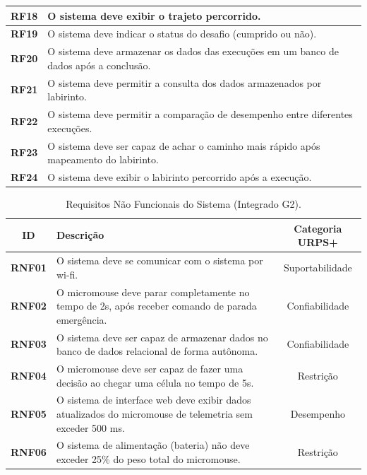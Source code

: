 \begin{table}[htbp]
\begin{center}
\begin{tabular}{|c|p{13cm}|}
\textbf{RF18} & O sistema deve exibir o trajeto percorrido. \\ \hline
\textbf{RF19} & O sistema deve indicar o status do desafio (cumprido ou não). \\ \hline
\textbf{RF20} & O sistema deve armazenar os dados das execuções em um banco de dados após a conclusão. \\ \hline
\textbf{RF21} & O sistema deve permitir a consulta dos dados armazenados por labirinto. \\ \hline
\textbf{RF22} & O sistema deve permitir a comparação de desempenho entre diferentes execuções. \\ \hline
\textbf{RF23} & O sistema deve ser capaz de achar o caminho mais rápido após mapeamento do labirinto. \\ \hline
\textbf{RF24} & O sistema deve exibir o labirinto percorrido após a execução. \\ \hline
\end{tabular}
\end{center}
\label{RF}
\end{table}

\begin{table}[htbp]
\begin{center}
\scriptsize
\setlength{\tabcolsep}{4pt}
\renewcommand{\arraystretch}{1}
\caption{Requisitos Não Funcionais do Sistema (Integrado G2).}
\begin{tabular}{|c|p{10cm}|c|}
\hline
\textbf{ID} & \textbf{Descrição} & \textbf{Categoria URPS+} \\
\hline
\textbf{RNF01} & O sistema deve se comunicar com o sistema por wi-fi. & Suportabilidade \\ \hline
\textbf{RNF02} & O micromouse deve parar completamente no tempo de 2s, após receber comando de parada emergência. & Confiabilidade \\ \hline
\textbf{RNF03} & O sistema deve ser capaz de armazenar dados no banco de dados relacional de forma autônoma. & Confiabilidade \\ \hline
\textbf{RNF04} & O micromouse deve ser capaz de fazer uma decisão ao chegar uma célula no tempo de 5s. & Restrição \\ \hline
\textbf{RNF05} & O sistema de interface web deve exibir dados atualizados do micromouse de telemetria sem exceder 500 ms. & Desempenho \\ \hline
\textbf{RNF06} & O sistema de alimentação (bateria) não deve exceder 25\% do peso total do micromouse. & Restrição \\ \hline
\end{tabular}
\end{center}
\label{RNF}
\end{table}

